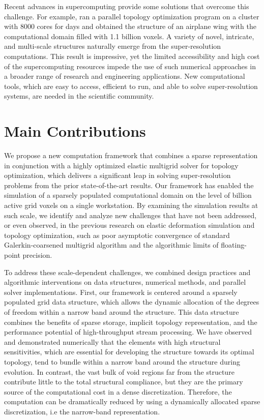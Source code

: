Recent advances in supercomputing provide some solutions that overcome this challenge.
For example, \cite{Aage2017GigavoxelCM} ran a parallel topology optimization program on a cluster with 8000 cores for days and obtained the structure of an airplane wing with the computational domain filled with 1.1 billion voxels.
A variety of novel, intricate, and multi-scale structures naturally emerge from the super-resolution computations.
This result is impressive, yet the limited accessibility and high cost of the supercomputing resources impede the use of such numerical approaches in a broader range of research and engineering applications. 
New computational tools, which are easy to access, efficient to run, and able to solve super-resolution systems, are needed in the scientific community.

\section{Main Contributions}
We propose a new computation framework that combines a sparse representation in conjunction with a highly optimized elastic multigrid solver for topology optimization, which delivers a significant leap in solving super-resolution problems from the prior state-of-the-art results.
Our framework has enabled the simulation of a sparsely populated computational domain on the level of billion active grid voxels on a single workstation. 
By examining the simulation results at such scale, we identify and analyze new challenges that have not been addressed, or even observed, in the previous research on elastic deformation simulation and topology optimization, such as poor asymptotic convergence of standard Galerkin-coarsened multigrid algorithm and the algorithmic limits of floating-point precision.

To address these scale-dependent challenges, we combined design practices and algorithmic interventions on data structures, numerical methods, and parallel solver implementations.
First, our framework is centered around a sparsely populated grid data structure, which allows the dynamic allocation of the degrees of freedom within a narrow band around the structure.  
This data structure combines the benefits of sparse storage, implicit topology representation, and the performance potential of high-throughput stream processing.
We have observed and demonstrated numerically that the elements with high structural sensitivities, which are essential for developing the structure towards its optimal topology, tend to bundle within a narrow band around the structure during evolution. 
In contrast, the vast bulk of void regions far from the structure contribute little to the total structural compliance, but they are the primary source of the computational cost in a dense discretization.
Therefore, the computation can be dramatically reduced by using a dynamically allocated sparse discretization, i.e the narrow-band representation.

